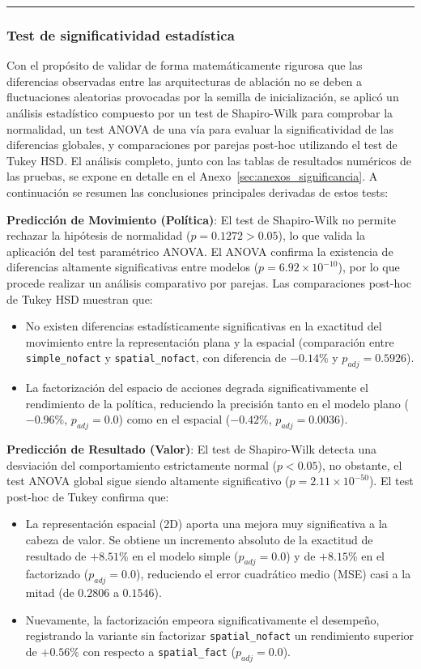 \documentclass[12pt, a4paper]{article}
\begin{document}
\rule{\textwidth}{0.2pt}
\subsubsection{Test de significatividad estadística}

Con el propósito de validar de forma matemáticamente rigurosa que las diferencias observadas entre las arquitecturas de ablación no se deben a fluctuaciones aleatorias provocadas por la semilla de inicialización, se aplicó un análisis estadístico compuesto por un test de Shapiro-Wilk para comprobar la normalidad, un test ANOVA de una vía para evaluar la significatividad de las diferencias globales, y comparaciones por parejas post-hoc utilizando el test de Tukey HSD. El análisis completo, junto con las tablas de resultados numéricos de las pruebas, se expone en detalle en el Anexo~\ref{sec:anexos_significancia}. A continuación se resumen las conclusiones principales derivadas de estos tests:

\textbf{Predicción de Movimiento (Política)}: El test de Shapiro-Wilk no permite rechazar la hipótesis de normalidad ($p = 0.1272 > 0.05$), lo que valida la aplicación del test paramétrico ANOVA. El ANOVA confirma la existencia de diferencias altamente significativas entre modelos ($p = 6.92 \times 10^{-10}$), por lo que procede realizar un análisis comparativo por parejas. Las comparaciones post-hoc de Tukey HSD muestran que:
\begin{itemize}
    \item No existen diferencias estadísticamente significativas en la exactitud del movimiento entre la representación plana y la espacial (comparación entre \texttt{simple\_nofact} y \texttt{spatial\_nofact}, con diferencia de $-0.14\%$ y $p_{adj} = 0.5926$).
    \item La factorización del espacio de acciones degrada significativamente el rendimiento de la política, reduciendo la precisión tanto en el modelo plano ($-0.96\%$, $p_{adj} = 0.0$) como en el espacial ($-0.42\%$, $p_{adj} = 0.0036$).
\end{itemize}

\textbf{Predicción de Resultado (Valor)}: El test de Shapiro-Wilk detecta una desviación del comportamiento estrictamente normal ($p < 0.05$), no obstante, el test ANOVA global sigue siendo altamente significativo ($p = 2.11 \times 10^{-50}$). El test post-hoc de Tukey confirma que:
\begin{itemize}
    \item La representación espacial (2D) aporta una mejora muy significativa a la cabeza de valor. Se obtiene un incremento absoluto de la exactitud de resultado de $+8.51\%$ en el modelo simple ($p_{adj} = 0.0$) y de $+8.15\%$ en el factorizado ($p_{adj} = 0.0$), reduciendo el error cuadrático medio (MSE) casi a la mitad (de $0.2806$ a $0.1546$).
    \item Nuevamente, la factorización empeora significativamente el desempeño, registrando la variante sin factorizar \texttt{spatial\_nofact} un rendimiento superior de $+0.56\%$ con respecto a \texttt{spatial\_fact} ($p_{adj} = 0.0$).
\end{itemize}
\end{document}
